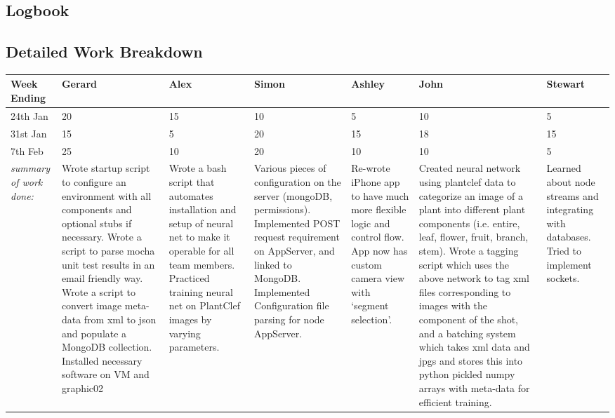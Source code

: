 \documentclass[a4paper,11pt]{article}
\begin{document}
\begin{landscape}

\section{Logbook}

\subsection{Detailed Work Breakdown}

\small
\setlength\LTleft{0pt}            %
\setlength\LTright{0pt}           %
\noindent
\begin{longtable}
	{| p{1.5cm} | p{3cm} | p{3cm} | p{3cm} | p{3cm} | p{3cm} | p{3cm} | } \\ \hline
	Week Ending & Gerard & Alex & Simon & Ashley & John & Stewart \\ \hline
	24th Jan & 20 & 15 & 10 & 5 & 10 & 5 \\ \hline 
	31st Jan & 15 & 5 & 20 & 15 & 18 & 15 \\ \hline 
	7th Feb & 25 & 10 & 20 & 10 & 10 & 5 \\ \hline
	\textit{summary of work done:}
		& Wrote startup script to configure an environment with all components and optional stubs if necessary. Wrote a script to parse mocha unit test results in an email friendly way. Wrote a script to convert image meta-data from xml to json and populate a MongoDB collection. Installed necessary software on VM and graphic02	
		& Wrote a bash script that automates installation and setup of neural net to make it operable for all team members. Practiced training neural net on PlantClef images by varying parameters.	
		& Various pieces of configuration on the server (mongoDB, permissions). Implemented POST request requirement on AppServer, and linked to MongoDB. Implemented Configuration file parsing for node AppServer.	
		& Re-wrote iPhone app to have much more flexible logic and control flow. App now has custom camera view with `segment selection'.
		& Created neural network using plantclef data to categorize an image of a plant into different plant components (i.e. entire, leaf, flower, fruit, branch, stem). Wrote a tagging script which uses the above network to tag xml files corresponding to images with the component of the shot, and a batching system which takes xml data and jpgs and stores this into python pickled numpy arrays with meta-data for efficient training.	
		& Learned about node streams and integrating with databases. Tried to implement sockets. 

\end{longtable}
\end{landscape}
\end{document}
